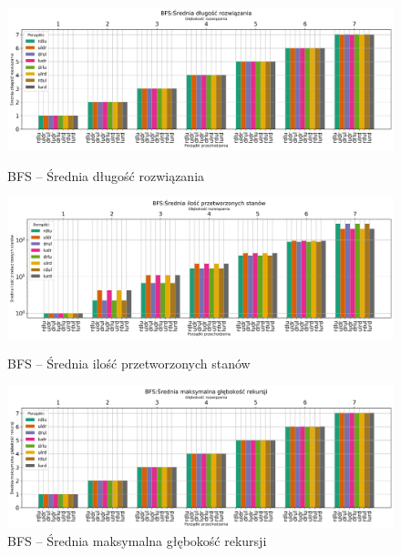 \documentclass{classrep}
\begin{document}
\begin{figure}[H]
    \includegraphics[width=\textwidth]{charts/BFS_path_length.png}
    \caption{BFS -- Średnia długość rozwiązania}
    \label{BFS:path_length}
    \vspace{0.2cm}
    \includegraphics[width=\textwidth]{charts/BFS_processed.png}
    \caption{BFS -- Średnia ilość przetworzonych stanów}
    \label{BFS:processed}
    \vspace{0.2cm}
    \includegraphics[width=\textwidth]{charts/BFS_recursed.png}
    \caption{BFS --  Średnia maksymalna głębokość rekursji}
    \label{BFS:recursed}

\end{figure}
\end{document}
